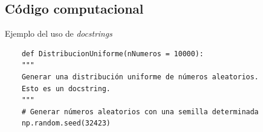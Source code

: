 \subsection{Código computacional}

\begin{algorithm}[h!]
        \caption{Ejemplo del uso de \textit{docstrings}}
    \begin{verbatim}
    def DistribucionUniforme(nNumeros = 10000):
    """
    Generar una distribución uniforme de números aleatorios. 
    Esto es un docstring.
    """
    # Generar números aleatorios con una semilla determinada
    np.random.seed(32423)
    \end{verbatim}
\end{algorithm}
\newpage

